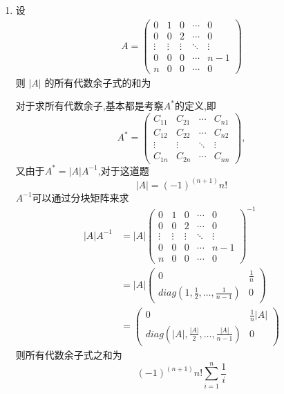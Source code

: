 \documentclass[12pt, a4paper, oneside, UTF8]{ctexbook}
\begin{document}
\begin{enumerate}[label=\arabic*.,start=5]
    \item 设 
    \begin{align*}
    A=\begin{pmatrix}
    0 & 1 & 0 & \cdots & 0\\
    0 & 0 & 2 &\cdots & 0 \\
    \vdots & \vdots & \vdots & \ddots &\vdots  \\
    0 & 0 & 0&\cdots & n-1\\
    n & 0 & 0&\cdots & 0 
    \end{pmatrix}
    \end{align*}
    则 $|A|$ 的所有代数余子式的和为\underline{\hspace{3cm}}
    
    \begin{solution}
    对于求所有代数余子,基本都是考察$A^{*}$的定义,即
    \[
    A^* = \begin{pmatrix}
    C_{11} & C_{21} & \cdots & C_{n1} \\
    C_{12} & C_{22} & \cdots & C_{n2} \\
    \vdots & \vdots & \ddots & \vdots \\
    C_{1n} & C_{2n} & \cdots & C_{nn}
    \end{pmatrix},
    \]
    又由于$A^{*}=\left|A\right|A^{-1}$,对于这道题
    \[
    \left|A\right|=(-1)^{(n+1)}n!
    \]
    $A^{-1}$可以通过分块矩阵来求
    \begin{align*}
    |A|A^{-1} 
    &=|A|\left(
    \begin{array}{r|rrrr}
    0 & 1 & 0 & \cdots & 0\\
    0 & 0 & 2 &\cdots & 0 \\
    \vdots & \vdots & \vdots & \ddots &\vdots  \\
    0 & 0 & 0&\cdots & n-1\\
    \hline
    n & 0 & 0&\cdots & 0 
    \end{array}\right)^{-1} \\
    &=|A|\left(
    \begin{array}{l|l}
    0 & \frac{1}{n} \\
    \hline
    diag(1,\frac{1}{2},\ldots,\frac{1}{n-1}) & 0
    \end{array}\right) \\
    &= \left(
    \begin{array}{l|l}
    0 & \frac{1}{n} |A| \\
    \hline
    diag(|A|,\frac{|A|}{2},\ldots,\frac{|A|}{n-1}) & 0
    \end{array}\right)
    \end{align*}
    则所有代数余子式之和为$$(-1)^{(n+1)}n!\sum_{i=1}^{n}{\frac{1}{i}}$$
    \end{solution}
\end{enumerate}
\end{document}
